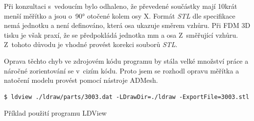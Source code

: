 Při konzultaci s~vedoucím bylo odhaleno, že převedené součástky mají 10krát menší měřítko a jsou o~90° otočené kolem osy X. Formát \textit{\gls{STL}} dle specifikace \autocite{stl:specification} nemá jednotku a není definováno, která osa ukazuje směrem vzhůru. Při \gls{FDM} 3D tisku je však praxí, že se předpokládá jednotka mm a osa Z~směřující vzhůru. Z~tohoto důvodu je vhodné provést korekci souborů \textit{STL}.

Oprava těchto chyb ve zdrojovém kódu programu by stála velké množství práce a náročné zorientování se v~cizím kódu. Proto jsem se rozhodl opravu měřítka a natočení modelu provést pomocí nástroje ADMesh. 

 \begin{listing}[htbp]
        \begin{verbatim}
$ ldview ./ldraw/parts/3003.dat -LDrawDir=./ldraw -ExportFile=3003.stl 
        \end{verbatim}
    \caption{Příklad použití programu LDView \label{priklad-ldview}}
\end{listing}


